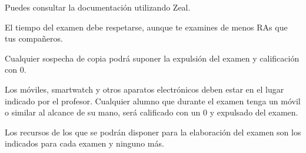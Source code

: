 \item Puedes consultar la documentación utilizando Zeal.
\item El tiempo del examen debe respetarse, aunque te examines de menos RAs que tus compañeros.
\item Cualquier sospecha de copia podrá suponer la expulsión del examen y calificación con 0. 
\item Los móviles, smartwatch y otros aparatos electrónicos deben estar en el lugar indicado por el profesor. Cualquier alumno que durante el examen tenga un móvil o similar al alcance de su mano, será calificado con un 0 y expulsado del examen. 
\item Los recursos de los que se podrán disponer para la elaboración del examen son los indicados para cada examen y ninguno más.
